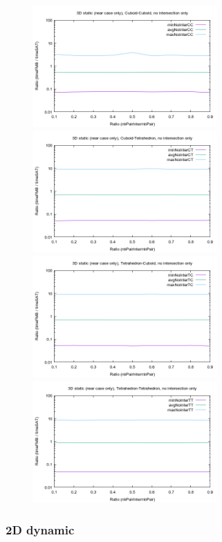 \documentclass[12pt, a4paper]{article}
\begin{document}
\begin{center}
\begin{figure}[H]
\centering\includegraphics[width=7cm]{../Results/qualification3DCCnointerNearCaseOnly.png}
\centering\includegraphics[width=7cm]{../Results/qualification3DCTnointerNearCaseOnly.png}
\centering\includegraphics[width=7cm]{../Results/qualification3DTCnointerNearCaseOnly.png}
\centering\includegraphics[width=7cm]{../Results/qualification3DTTnointerNearCaseOnly.png}
\end{figure}
\end{center}

\subsubsection{2D dynamic}
\end{document}
